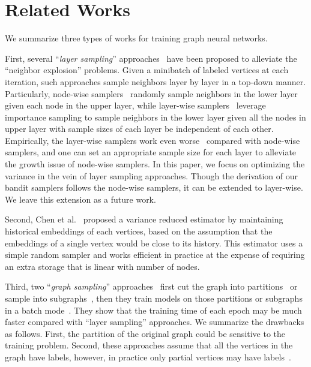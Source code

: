 \documentclass{article}
\begin{document}
\section{Related Works}
We summarize three types of works for training graph neural networks.

First, several ``\textit{layer sampling}'' 
approaches~\cite{hamilton2017inductive,chen2018fastgcn,huang2018adaptive,zou2019layer} have been 
proposed to alleviate the ``neighbor explosion'' problems. 
Given a minibatch of labeled vertices at each 
iteration, such approaches sample neighbors layer by 
layer in a top-down manner.
Particularly, node-wise samplers~\cite{hamilton2017inductive} randomly sample
neighbors in the lower layer given each node in the upper layer, 
while layer-wise samplers~\cite{chen2018fastgcn,huang2018adaptive,zou2019layer} 
leverage importance sampling to sample neighbors in the lower
layer given all the nodes in upper layer with sample sizes
of each layer be independent of each other. 
Empirically, the layer-wise samplers work even 
worse~\cite{chen2017stochastic}
compared with node-wise samplers, and
one can set an appropriate sample size for each
layer to alleviate the growth issue of node-wise samplers.
In this paper, we focus on optimizing the variance
in the vein of layer sampling approaches.
Though the derivation of our bandit samplers follows 
the node-wise samplers, it can be extended
to layer-wise. We leave this extension 
as a future work.

Second, Chen et al.~\cite{chen2017stochastic} proposed 
a variance reduced estimator by maintaining 
historical embeddings of each vertices,
based on the assumption that the embeddings of 
a single vertex would be
close to its history. This estimator uses a simple 
random sampler and works efficient in practice at
the expense of requiring an extra storage that
is linear with number of nodes.

Third, two ``\textit{graph sampling}'' 
approaches~\cite{chiang2019cluster,zeng2019graphsaint} 
first cut the graph into partitions~\cite{chiang2019cluster} or 
sample into subgraphs~\cite{zeng2019graphsaint}, then they train 
models on those partitions or subgraphs in a batch 
mode~\cite{kipf2016semi}.
They show that the training time of each epoch may be much faster
compared with ``layer sampling'' approaches.
We summarize the drawbacks as follows. 
First, the partition of the original graph
could be sensitive to the training problem. Second, these
approaches assume that all the vertices in the graph
have labels, however, in practice 
only partial vertices may have labels~\cite{hu2019cash,liu2018heterogeneous}.
\end{document}
